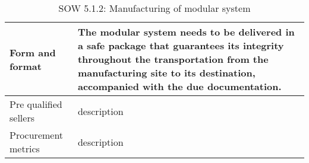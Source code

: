 \begin{table}[H]
\begin{tabular}{>{\raggedright\arraybackslash}p{3cm} >{\arraybackslash}p{11cm}}
		\midrule
		
		Form and format & The modular system needs to be delivered in a safe package that guarantees its integrity throughout the transportation from the manufacturing site to its destination, accompanied with the due documentation.\vspace{0.2cm} \\
		
		\midrule
		
		Pre qualified sellers & description\vspace{0.2cm} \\
		
		\midrule
		
		Procurement metrics & description\vspace{0.2cm} \\
		
		\bottomrule[2pt]		
		
	\end{tabular}
	\caption{SOW 5.1.2: Manufacturing of modular system}
\end{table}

